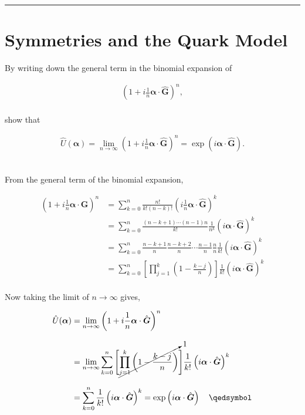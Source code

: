 
\noindent\rule{7in}{2.8pt}
\section{Symmetries and the Quark Model}
    
\begin{problem}{9.1}
By writing down the general term in the binomial expansion of

\begin{align*}
    \left( 1+ i \frac{1}{n} \boldsymbol{\alpha} \cdot \hat{\boldsymbol{G}}\right)^n,
\end{align*}\\
show that

\begin{align*}
    \hat{U}(\boldsymbol{\alpha}) = \lim_{n\to\infty}   \left( 1+ i \frac{1}{n} \boldsymbol{\alpha} \cdot \hat{\boldsymbol{G}}\right)^n = \exp \left( i   \boldsymbol{\alpha} \cdot \hat{\boldsymbol{G}} \right).
\end{align*}\\
\end{problem}
\begin{solution}
From the general term of the binomial expansion,

    \begin{align*}
        \left( 1+ i \frac{1}{n} \boldsymbol{\alpha} \cdot \hat{\boldsymbol{G}}\right)^n &= \sum_{k=0}^n \frac{n!}{k!\left( n-k \right)!} \left(  i \frac{1}{n} \boldsymbol{\alpha} \cdot \hat{\boldsymbol{G}}\right)^k \\[0.12in]
        &= \sum_{k=0}^n \frac{\left( n-k+1 \right) \cdots\left( n-1 \right) n}{k! } \frac{1}{n^k} \left(  i   \boldsymbol{\alpha} \cdot \hat{\boldsymbol{G}}\right)^k \\[0.12in]
        &=  \sum_{k=0}^n  \frac{n-k+1}{n} \frac{n-k+2}{n} \cdots \frac{n-1}{n} \frac{n}{n} \frac{1}{k!} \left(  i   \boldsymbol{\alpha} \cdot \hat{\boldsymbol{G}}\right)^k \\[0.12in]
        &= \sum_{k=0}^n \left[ \prod_{j=1}^k\left(  1-\frac{k-j}{n}  \right)\right]\frac{1}{k!} \left(  i   \boldsymbol{\alpha} \cdot \hat{\boldsymbol{G}}\right)^k
    \end{align*}\\
    Now taking the limit of $n\to\infty$ gives,

    \begin{align*}
        \hat{U}(\boldsymbol{\alpha}) &= \lim_{n\to\infty}   \left( 1+ i \frac{1}{n} \boldsymbol{\alpha} \cdot \hat{\boldsymbol{G}}\right)^n \\[0.12in]
        &= \lim_{n\to\infty} \sum_{k=0}^n \Bigg[ \cancelto{1}{\prod_{j=1}^k\left(  1-\frac{k-j}{n}  \right)}\Bigg]\frac{1}{k!} \left(  i   \boldsymbol{\alpha} \cdot \hat{\boldsymbol{G}}\right)^k \\[0.12in]
        &= \sum_{k=0}^n \frac{1}{k!} \left(  i   \boldsymbol{\alpha} \cdot \hat{\boldsymbol{G}}\right)^k = \exp \left( i   \boldsymbol{\alpha} \cdot \hat{\boldsymbol{G}} \right) \qed
    \end{align*}
\end{solution}

